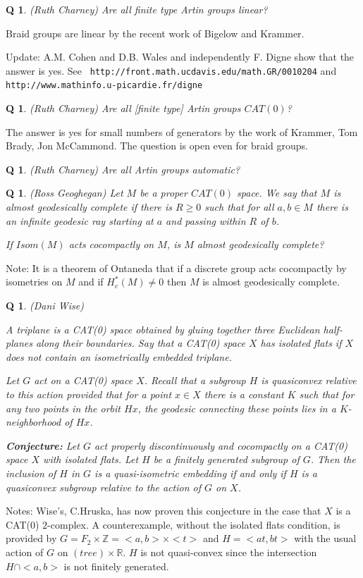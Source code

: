 \documentclass[11pt]{article}
\newtheorem{q}[thm]{Q}
\theoremstyle{remark}
\def\b{\begin{q}}
\def\e{\end{q}}
\def\R{{\mathbb R}}
\def\Z{{\mathbb Z}}
\newcommand{\<}{\langle}
\renewcommand{\>}{\rangle}
\begin{document}
\b
(Ruth Charney)
Are all finite type Artin groups linear? \e
Braid groups are linear by the
   recent work of Bigelow and Krammer. 

Update: A.M. Cohen and D.B. Wales and independently F. Digne show that
the answer is yes. See {\tt
http://front.math.ucdavis.edu/math.GR/0010204} and {\tt
http://www.mathinfo.u-picardie.fr/digne} 

\b (Ruth Charney) Are all
[finite type] Artin groups $CAT(0)$? \e The answer is yes for small
numbers of generators by the work of Krammer, Tom Brady, Jon
McCammond. The question is open even for braid groups.

\b
(Ruth Charney)
Are all Artin groups automatic?\e

\b
(Ross Geoghegan)
Let $M$ be a proper $CAT(0)$ space. We say that $M$ is {\it almost
  geodesically complete} if there is $R\geq 0$ such that for all $a,b\in M$
  there is an infinite geodesic ray starting at $a$ and passing within $R$ of
  $b$. 

If $Isom(M)$ acts cocompactly on $M$, is $M$ almost
geodesically complete? \e

Note: It is a theorem of Ontaneda that if a discrete group acts cocompactly by
isometries on $M$ and if $H^*_c(M)\neq 0$ then $M$ is almost geodesically
complete. 

\b
(Dani Wise)
{\rm A {\em triplane} is a CAT(0) space obtained by gluing together
three Euclidean half-planes along their boundaries.
%
 Say that a CAT(0) space $X$ has {\em isolated flats} if $X$ does not
contain an isometrically embedded triplane.

Let $G$ act on a CAT(0) space $X$. Recall that a subgroup $H$ is
quasiconvex relative to this action provided that for a point
$x\in X$ there is a constant $K$ such that for any two points in
the orbit $Hx$, the geodesic connecting these points lies in a
$K$-neighborhood of $Hx$.}

{\bf Conjecture:} Let $G$ act properly discontinuously and
cocompactly on a CAT(0) space $X$ with isolated flats. Let $H$ be
a finitely generated subgroup of $G$. Then the inclusion of $H$
in $G$ is a quasi-isometric embedding if and only if $H$ is a
quasiconvex subgroup relative to the action of $G$ on $X$.
\e

Notes: Wise's, C.Hruska, has now proven this conjecture in the
case that $X$ is a CAT(0) $2$-complex. A counterexample, without the
isolated flats condition, is provided by $G=F_2\times\Z=<a,b>\times
<t>$ and $H=<at,bt>$ with the usual action of $G$ on
$(tree)\times\R$. $H$ is not quasi-convex since the intersection
$H\cap <a,b>$ is not finitely generated.
\end{document}
